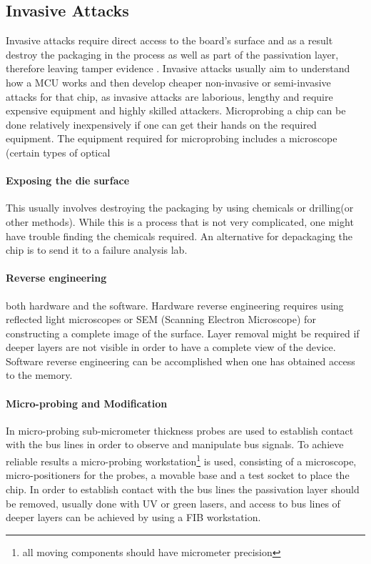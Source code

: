 	\subsection{Invasive Attacks}
	Invasive attacks require direct access to the board's surface and as a result destroy the packaging in the process as well as part of the passivation layer, therefore leaving tamper evidence\citep{sergei:thesis} \citep{hwre}. Invasive attacks usually aim to understand how a MCU works and then develop cheaper non-invasive or semi-invasive attacks for that chip, as invasive attacks are laborious, lengthy and require expensive equipment and highly skilled attackers\citep{sergei:thesis}. Microprobing a chip can be done relatively inexpensively if one can get their hands on the required equipment. The equipment required for microprobing includes a microscope (certain types of optical 
	
	\paragraph{Exposing the die surface} This usually involves destroying the packaging by using chemicals or drilling(or other methods). While this is a process that is not very complicated\citep{sergei:thesis}, one might have trouble finding the chemicals required. An alternative for depackaging the chip is to send it to a failure analysis lab\citep{website:hacking_the_pic}.
	
	\paragraph{Reverse engineering} both hardware and the software. Hardware reverse engineering requires using reflected light microscopes or SEM (Scanning Electron Microscope) for constructing a complete image of the surface. Layer removal might be required if deeper layers are not visible in order to have a complete view of the device. Software reverse engineering can be accomplished when one has obtained access to the memory.
	
	\paragraph{Micro-probing and Modification} In micro-probing sub-micrometer thickness probes are used to establish contact with the bus lines in order to observe and manipulate bus signals. To achieve reliable results a micro-probing workstation\footnote{all moving components should have micrometer precision} is used, consisting of a microscope, micro-positioners for the probes, a movable base and a test socket to place the chip. In order to establish contact with the bus lines the passivation layer should be removed, usually done with UV or green lasers, and access to bus lines of deeper layers can be achieved by using a FIB workstation. 
	
